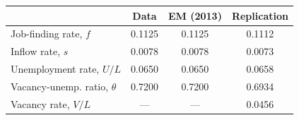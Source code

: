 \begin{tabular}{lccc}
\toprule
 & Data & EM (2013) & Replication \\
\midrule
Job-finding rate, $f$ & 0.1125 & 0.1125 & 0.1112 \\
Inflow rate, $s$ & 0.0078 & 0.0078 & 0.0073 \\
Unemployment rate, $U/L$ & 0.0650 & 0.0650 & 0.0658 \\
Vacancy-unemp. ratio, $\theta$ & 0.7200 & 0.7200 & 0.6934 \\
Vacancy rate, $V/L$ & — & — & 0.0456 \\
\bottomrule
\end{tabular}

